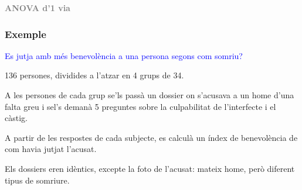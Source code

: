 \documentclass[12pt,t]{beamer}
\title[\red{Matemàtiques II}]{}
\author[]{}
\date{}
\newcommand{\blue}[1]{\textcolor{blue}{#1}}
\newcommand{\gray}[1]{\textcolor{gray}{#1}}
\renewcommand{\emph}[1]{{\color{red}#1}}
\theoremstyle{plain}
\theoremstyle{definition}
\begin{document}
\beamertemplatedotitem

\begin{frame}
\vfill
\begin{center}
\gray{\LARGE\bf ANOVA d'1 via}
\end{center}
\end{frame}

\begin{frame}
\frametitle{Exemple}
\blue{Es jutja amb més benevolència a una persona segons com somriu?}\medskip

136 persones, dividides a l'atzar en 4 grups de 34.\medskip

A les persones de cada grup se'ls passà un dossier on s'acusava a un home d'una falta greu i sel's demanà 5 preguntes sobre la culpabilitat de l'interfecte i el càstig.\medskip

A partir de les  respostes de  cada subjecte, es calculà un \emph{índex de benevolència}  de com havia jutjat l'acusat.\medskip

Els dossiers eren idèntics, excepte la foto de l'acusat: mateix home, però diferent tipus de somriure.

\end{frame}
\end{document}
